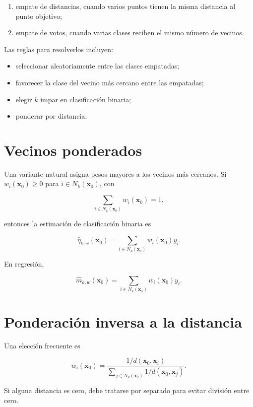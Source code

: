 \documentclass[
  spanish,
  11pt,
  letterpaper,
  DIV=11,
  numbers=noendperiod]{scrreprt}
\providecommand{\tightlist}{%
  \setlength{\itemsep}{0pt}\setlength{\parskip}{0pt}}
\theoremstyle{definition}
\theoremstyle{plain}
\theoremstyle{definition}
\theoremstyle{remark}
\begin{document}
\begin{enumerate}
\def\labelenumi{\arabic{enumi}.}
\tightlist
\item
  empate de distancias, cuando varios puntos tienen la misma distancia
  al punto objetivo;
\item
  empate de votos, cuando varias clases reciben el mismo número de
  vecinos.
\end{enumerate}

Las reglas para resolverlos incluyen:

\begin{itemize}
\tightlist
\item
  seleccionar aleatoriamente entre las clases empatadas;
\item
  favorecer la clase del vecino más cercano entre las empatadas;
\item
  elegir \(k\) impar en clasificación binaria;
\item
  ponderar por distancia.
\end{itemize}

\section{Vecinos ponderados}\label{vecinos-ponderados}

Una variante natural asigna pesos mayores a los vecinos más cercanos. Si
\(w_i(\mathbf{x}_0)\ge 0\) para \(i\in N_k(\mathbf{x}_0)\), con

\[
\sum_{i\in N_k(\mathbf{x}_0)} w_i(\mathbf{x}_0)=1,
\]

entonces la estimación de clasificación binaria es

\[
\widehat{\eta}_{k,w}(\mathbf{x}_0)
=
\sum_{i\in N_k(\mathbf{x}_0)}
w_i(\mathbf{x}_0)
y_i.
\]

En regresión,

\[
\widehat{m}_{k,w}(\mathbf{x}_0)
=
\sum_{i\in N_k(\mathbf{x}_0)}
w_i(\mathbf{x}_0)
y_i.
\]

\section{Ponderación inversa a la
distancia}\label{ponderaciuxf3n-inversa-a-la-distancia}

Una elección frecuente es

\[
w_i(\mathbf{x}_0)
=
\frac{1/d(\mathbf{x}_0,\mathbf{x}_i)}
{\sum_{j\in N_k(\mathbf{x}_0)}1/d(\mathbf{x}_0,\mathbf{x}_j)}.
\]

Si alguna distancia es cero, debe tratarse por separado para evitar
división entre cero.
\end{document}

